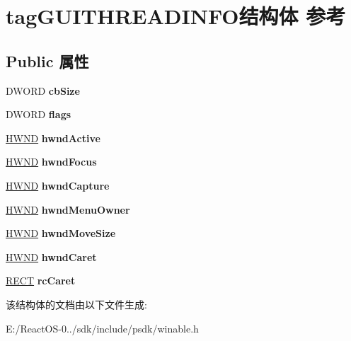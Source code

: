 \hypertarget{structtag_g_u_i_t_h_r_e_a_d_i_n_f_o}{}\section{tag\+G\+U\+I\+T\+H\+R\+E\+A\+D\+I\+N\+F\+O结构体 参考}
\label{structtag_g_u_i_t_h_r_e_a_d_i_n_f_o}
\subsection*{Public 属性}
\begin{DoxyCompactItemize}
\item 
\mbox{\label{structtag_g_u_i_t_h_r_e_a_d_i_n_f_o_a62783ebaa5d0acc902cbaf4b9e8a27d4}} 
D\+W\+O\+RD {\bfseries cb\+Size}
\item 
\mbox{\label{structtag_g_u_i_t_h_r_e_a_d_i_n_f_o_a0032e6c422e81ce8101d324e07fcb9bb}} 
D\+W\+O\+RD {\bfseries flags}
\item 
\mbox{\label{structtag_g_u_i_t_h_r_e_a_d_i_n_f_o_ad39621d0e89a0429204b69824ed290b1}} 
\hyperlink{interfacevoid}{H\+W\+ND} {\bfseries hwnd\+Active}
\item 
\mbox{\label{structtag_g_u_i_t_h_r_e_a_d_i_n_f_o_a3f9804182791a6ffe75b9865f5c19c5c}} 
\hyperlink{interfacevoid}{H\+W\+ND} {\bfseries hwnd\+Focus}
\item 
\mbox{\label{structtag_g_u_i_t_h_r_e_a_d_i_n_f_o_a665102c9499f58bac5208c2452526520}} 
\hyperlink{interfacevoid}{H\+W\+ND} {\bfseries hwnd\+Capture}
\item 
\mbox{\label{structtag_g_u_i_t_h_r_e_a_d_i_n_f_o_a440c19bc551178ee4b98624e9327f234}} 
\hyperlink{interfacevoid}{H\+W\+ND} {\bfseries hwnd\+Menu\+Owner}
\item 
\mbox{\label{structtag_g_u_i_t_h_r_e_a_d_i_n_f_o_a44ca43ac7fa6c38953713b25dddb39d1}} 
\hyperlink{interfacevoid}{H\+W\+ND} {\bfseries hwnd\+Move\+Size}
\item 
\mbox{\label{structtag_g_u_i_t_h_r_e_a_d_i_n_f_o_a363fbeaa02268345b4ddc6f7a79ca237}} 
\hyperlink{interfacevoid}{H\+W\+ND} {\bfseries hwnd\+Caret}
\item 
\mbox{\label{structtag_g_u_i_t_h_r_e_a_d_i_n_f_o_aa0206e4a558824656751710e19d505b3}} 
\hyperlink{structtag_r_e_c_t}{R\+E\+CT} {\bfseries rc\+Caret}
\end{DoxyCompactItemize}


该结构体的文档由以下文件生成\+:\begin{DoxyCompactItemize}
\item 
E\+:/\+React\+O\+S-\/0../sdk/include/psdk/winable.\+h\end{DoxyCompactItemize}

